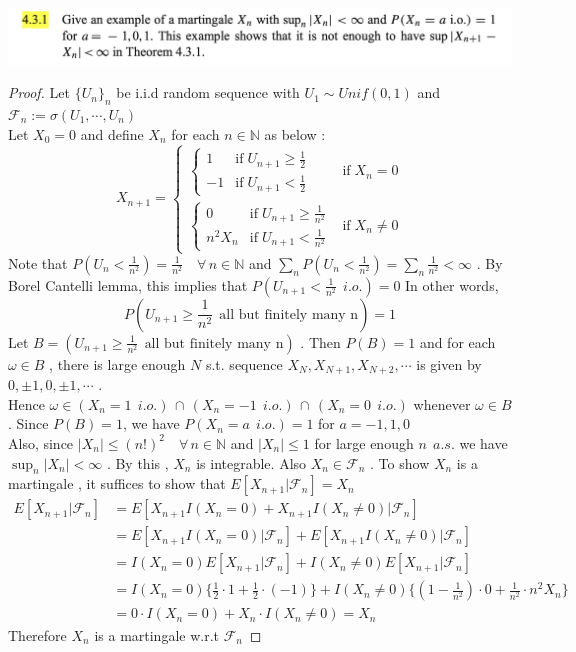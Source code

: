 \documentclass[12pt, A4]{article}
\newcommand{\N}{\mathbb{N}}
\newcommand{\F}{\mathcal{F}}
\newcommand{\intersect}{\,\cap\,}
\newcommand{\foranyn}{\quad \forall \, n\in \N}
\begin{document}
\includegraphics[width=17cm]{Exer4.3.1.png}
\begin{proof}
    Let $\{U_n\}_n$ be i.i.d random sequence with $U_1\sim Unif(0,1)$ and $\F_n:=\sigma(U_1, \cdots, U_n)$ \\ Let $X_0=0$ and define $X_n$ for each $n\in \N$ as below :
    \begin{equation*} 
        X_{n+1} =
        \begin{cases}
            \begin{cases}
                1 & \text{if}\; U_{n+1}\geq \frac{1}{2} \\
                -1 & \text{if}\; U_{n+1}< \frac{1}{2}
            \end{cases}
            & \text{if}\; X_n =0  \\
            \begin{cases}
                0 & \text{if}\; U_{n+1}\geq \frac{1}{n^2} \\
                n^2 X_n & \text{if}\; U_{n+1}< \frac{1}{n^2}
            \end{cases} & \text{if}\; X_n\neq 0
        \end{cases}
    \end{equation*}
    Note that $P(U_n<\frac{1}{n^2})=\frac{1}{n^2}\foranyn$ and $\sum_n P(U_n<\frac{1}{n^2})= \sum_n \frac{1}{n^2}<\infty$ . By Borel Cantelli lemma, this implies that $P(U_{n+1}<\frac{1}{n^2}\;\,i.o.)=0$ In other words, $$ P(U_{n+1}\geq \frac{1}{n^2}\;\,\text{all but finitely many n})=1$$
    Let $B=(U_{n+1}\geq \frac{1}{n^2}\;\,\text{all but finitely many n})$ . Then $P(B)=1$ and for each $\omega\in B$ , there is large enough $N$ s.t. sequence $X_N, X_{N+1}, X_{N+2}, \cdots$ is given by $0,\pm1, 0, \pm1, \cdots$ . \\ Hence $\omega \in (X_n=1\;\,i.o.)\intersect (X_n=-1\;\,i.o.)\intersect (X_n=0\;\,i.o.)$ whenever $\omega\in B$ . Since $P(B)=1$, we have $P(X_n=a \;\,i.o.)=1$ for $a=-1,1,0$ \\ Also, since $|X_n|\leq (n!)^2 \foranyn$ and $|X_n|\leq 1$ for large enough $n\;\,a.s.$ we have $\sup_n|X_n|<\infty$ . By this , $X_n$ is integrable. Also $X_n\in \F_n$ . To show $X_n$ is a martingale , it suffices to show that $E[X_{n+1}|\F_n]=X_n$
    \begin{align*}
        E[X_{n+1}|\F_n] &=E[X_{n+1}I(X_n=0)+X_{n+1}I(X_n\neq 0)|\F_n] \\
        &= E[X_{n+1}I(X_n=0)|\F_n] +E[X_{n+1}I(X_n\neq 0)|\F_n] \\
        &= I(X_n=0)E[X_{n+1}|\F_n] + I(X_n\neq 0)E[X_{n+1}|\F_n] \\
        &= I(X_n=0)\{\frac{1}{2}\cdot 1+\frac{1}{2}\cdot (-1)\} + I(X_n\neq 0)\Big\{(1-\frac{1}{n^2})\cdot 0 + \frac{1}{n^2}\cdot n^2X_n\Big\} \\ 
        &= 0\cdot I(X_n=0) + X_n\cdot I(X_n\neq 0) = X_n
    \end{align*}
    Therefore $X_n$ is a martingale w.r.t $\F_n$
\end{proof}
\vspace{1cm}
\end{document}

